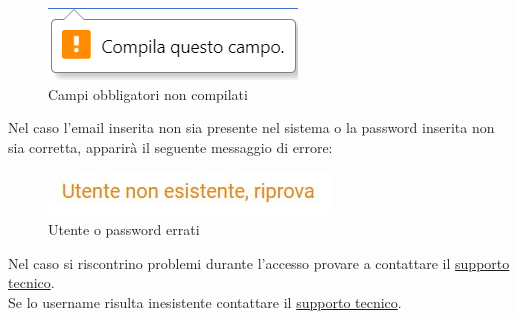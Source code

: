 \documentclass{article}
\begin{document}
\begin{figure}[H]
      \centering
      \includegraphics{documenti/Screenshot manuale utente/compila questo campo.png}
      \caption{Campi obbligatori non compilati}
      \label{campiobb}
    \end{figure}
Nel caso l'email inserita non sia presente nel sistema o la password inserita non sia corretta, apparirà il seguente messaggio di errore:
\begin{figure}[H]
      \centering
      \includegraphics{documenti/Screenshot manuale utente/utente non esistente.jpeg}
      \caption{Utente o password errati}
      \label{errlog}
    \end{figure}


Nel caso si riscontrino problemi durante l'accesso provare a contattare il \hyperlink{linkSup}{supporto tecnico}. \\
Se lo username risulta inesistente contattare il \hyperlink{linkSup}{supporto tecnico}.
\end{document}
